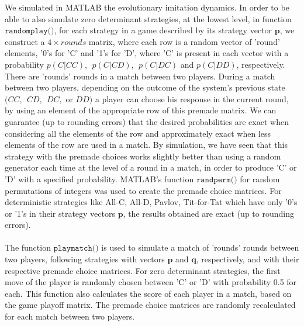 \documentclass[12pt]{article}
\begin{document}
We simulated in MATLAB the evolutionary imitation dynamics. In order to be able to also simulate zero determinant strategies, at the lowest level, in function $\texttt{randomplay()}$, for each strategy in a game described by its strategy vector $\mathbf{p}$, we construct a $4\times rounds$ matrix, where each row is a random vector of 'round' elements, '0's for 'C' and '1's for 'D', where 'C' is present in each vector with a probability $p(C|CC),\ \ p(C|CD),\ \ p(C|DC)$ and $p(C|DD)$, respectively. There are 'rounds' rounds in a match between two players. During a match between two players, depending on the outcome of the system's previous state $(CC,\ \ CD,\ \ DC,$ or $DD)$ a player can choose his response in the current round, by using an element  of the appropriate row of this premade matrix. We can guarantee (up to rounding errors) that the desired probabilities are exact when considering all the elements of the row and approximately exact when less elements of the row are used in a match. By simulation, we have seen that this strategy with the premade choices works slightly better than using a random generator each time at the level of a round in a match, in order to produce 'C' or 'D' with a specified probability. MATLAB's function $\texttt{randperm()}$ for random permutations of integers was used to create the premade choice matrices. For deterministic strategies like All-C, All-D, Pavlov, Tit-for-Tat which have only '0's or '1's in their strategy vectors $\mathbf{p}$, the results obtained are exact (up to rounding errors).
\\\\
The function $\texttt{playmatch()}$ is used to simulate a match of 'rounds' rounds between two players, following strategies with vectors $\mathbf{p}$ and $\mathbf{q}$, respectively, and with their respective premade choice matrices. For zero determinant strategies, the first move of the player is randomly chosen between 'C' or 'D' with probability 0.5 for each. This function also calculates the score of each player in a match, based on the game playoff matrix. The premade choice matrices are randomly recalculated for each match between two players.
\\\\
\end{document}
